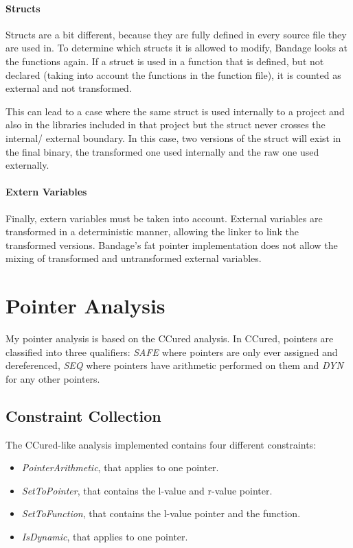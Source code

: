 \paragraph{Structs}
Structs are a bit different, because they are fully defined in every source file they are used in.
To determine which structs it is allowed to modify, Bandage looks at the functions again.
If a struct is used in a function that is defined, but not declared (taking into account the functions in the function file), it is counted as external and not transformed.

This can lead to a case where the same struct is used internally to a project and also in the libraries included in that project but the struct never crosses the internal/ external boundary.
In this case, two versions of the struct will exist in the final binary, the transformed one used internally and the raw one used externally.

\paragraph{Extern Variables}
Finally, extern variables must be taken into account.
External variables are transformed in a deterministic manner, allowing the linker to link the transformed versions.
Bandage's fat pointer implementation does not allow the mixing of transformed and untransformed external variables.
\section{Pointer Analysis}

My pointer analysis is based on the CCured analysis.
In CCured, pointers are classified into three qualifiers: \textit{SAFE} where pointers are only ever assigned and dereferenced, \textit{SEQ} where pointers have arithmetic performed on them and \textit{DYN} for any other pointers.

\subsection{Constraint Collection}

The CCured-like analysis implemented contains four different constraints:
\begin{itemize}
\item \textit{PointerArithmetic}, that applies to one pointer.
\item \textit{SetToPointer}, that contains the l-value and r-value pointer.
\item \textit{SetToFunction}, that contains the l-value pointer and the function.
\item \textit{IsDynamic}, that applies to one pointer.
\end{itemize}

